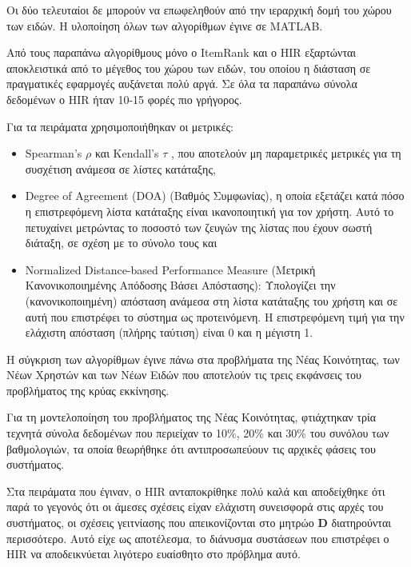 Οι δύο τελευταίοι δε μπορούν να επωφεληθούν από την ιεραρχική δομή του χώρου των ειδών. Η υλοποίηση όλων των αλγορίθμων έγινε σε {\en MATLAB}. \par
Από τους παραπάνω αλγορίθμους μόνο ο {\en ItemRank} και ο {\en HIR} εξαρτώνται αποκλειστικά από το μέγεθος του χώρου των ειδών, του οποίου η διάσταση σε πραγματικές εφαρμογές αυξάνεται πολύ αργά. Σε όλα τα παραπάνω σύνολα δεδομένων ο {\en HIR} ήταν 10-15 φορές πιο γρήγορος. \par
Για τα πειράματα χρησιμοποιήθηκαν οι μετρικές:
\begin{itemize}
 \item {\en Spearman's $\rho$} \cite{mcdonald:statistics} και {\en Kendall's $\tau$} \cite{Kendall1948}, που αποτελούν μη παραμετρικές μετρικές για τη συσχέτιση ανάμεσα σε λίστες κατάταξης,
 \item {\en Degree of Agreement (DOA)} \cite{citeulike:1055526, Gori:2007:IRB:1625275.1625720} (Βαθμός Συμφωνίας), η οποία εξετάζει κατά πόσο η επιστρεφόμενη λίστα κατάταξης είναι ικανοποιητική για τον χρήστη. Αυτό το πετυχαίνει μετρώντας το ποσοστό των ζευγών της λίστας που έχουν σωστή διάταξη, σε σχέση με το σύνολο τους και
 \item {\en Normalized Distance-based Performance Measure} \cite{Yao95measuringretrieval, furnell2000proceedings} (Μετρική Κανονικοποιημένης Απόδοσης Βάσει Απόστασης): Υπολογίζει την (κανονικοποιημένη) απόσταση ανάμεσα στη λίστα κατάταξης του χρήστη και σε αυτή που επιστρέφει το σύστημα ως προτεινόμενη. Η επιστρεφόμενη τιμή για την ελάχιστη απόσταση (πλήρης ταύτιση) είναι 0 και η μέγιστη 1.  
\end{itemize}\par
H σύγκριση των αλγορίθμων έγινε πάνω στα προβλήματα της Νέας Κοινότητας, των Νέων Χρηστών και των Νέων Ειδών που αποτελούν τις τρεις 
εκφάνσεις του προβλήματος της κρύας εκκίνησης. \par
Για τη μοντελοποίηση του προβλήματος της Νέας Κοινότητας, φτιάχτηκαν τρία τεχνητά σύνολα δεδομένων που περιείχαν το 10\%, 20\% και 30\% του συνόλου των βαθμολογιών, τα οποία θεωρήθηκε ότι αντιπροσωπεύουν τις αρχικές φάσεις του συστήματος. \par
Στα πειράματα που έγιναν, ο {\en HIR} ανταποκρίθηκε πολύ καλά και αποδείχθηκε ότι παρά το γεγονός ότι οι άμεσες σχέσεις είχαν ελάχιστη συνεισφορά στις αρχές του συστήματος, οι σχέσεις γειτνίασης που απεικονίζονται στο μητρώο $\mathbf{D}$ διατηρούνται περισσότερο. Αυτό είχε ως αποτέλεσμα, το διάνυσμα συστάσεων που επιστρέφει ο {\en HIR} να αποδεικνύεται λιγότερο ευαίσθητο στο πρόβλημα αυτό.\par
